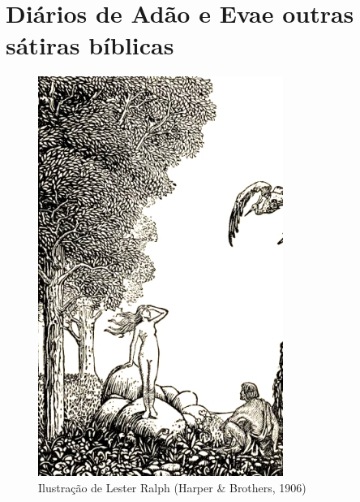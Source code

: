 \bgroup\makeatletter\def\@endpart{\vfil\newpage}
\part[Diários de Adão e Eva\\ e outras sátiras bíblicas]{Diários de Adão e Eva\break e outras sátiras bíblicas} 
\makeatother\egroup
%
\thispagestyle{empty}	
\begin{figure}\begin{center}
	\includegraphics[width=8cm]{img2.png}
	\caption{Ilustração de Lester Ralph (Harper \& Brothers, 1906)}
\end{center}\end{figure}
%

%
%

%
